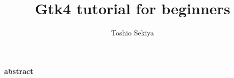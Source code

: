 \documentclass[a4paper]{article}
\title{Gtk4 tutorial for beginners}
\author{Toshio Sekiya}
\date{}
\begin{document}
\maketitle
\begin{center}
\textbf{abstract}
\end{center}

\newpage
\tableofcontents
\newpage
  
  
  
  
  
  
  
  
  
  
  
  
  
  
  
  
  
  
  
  
  
  
  
  
  
  
  
  
  
  
  
  
  
\newpage
\appendix
  
  
  
\end{document}
